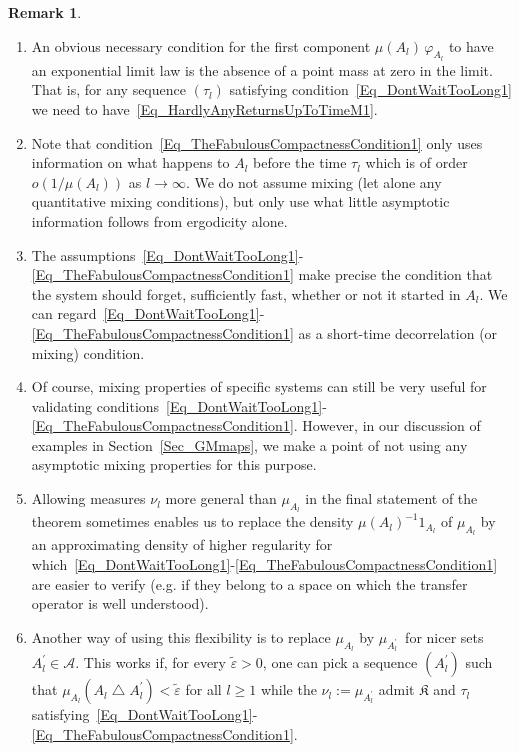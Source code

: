 \documentclass[10pt]{amsart}
\theoremstyle{definition}\newtheorem{defi}[theo]{Definition}\newtheorem{rema}[theo]{Remark}\newtheorem{exam}[theo]{Example}\newtheorem{exem}[theo]{Example}\newtheorem{nota}[theo]{Notation}
\newcommand{\clA}{\mathcal{A}}
\newcommand{\frkK}{\mathfrak{K}}
\newcommand*{\alphenumi}{\renewcommand*{\theenumi}{\alph{enumi}}}
\begin{document}
\begin{rema}\leavevmode
\begin{enumerate}\alphenumi
\item\label{rema3.7.a} An obvious necessary condition for the first component $\mu (A_{l})\,\varphi_{A_{l}}$ to have an exponential limit law is the absence of a point mass at zero in the limit. That is, for any sequence $(\tau_{l})$ satisfying condition~\eqref{Eq_DontWaitTooLong1} we need to have~\eqref{Eq_HardlyAnyReturnsUpToTimeM1}.
\item\label{rema3.7.b} Note that condition~\eqref{Eq_TheFabulousCompactnessCondition1} only uses information on what happens to $A_{l}$ before the time $\tau_{l}$ which is of order $o(1/\mu (A_{l}))$ as $l\rightarrow\infty$. We do not assume mixing (let alone any quantitative mixing conditions), but only use what little asymptotic information follows from ergodicity alone.
\item\label{rema3.7.c} The assumptions~\eqref{Eq_DontWaitTooLong1}-\eqref{Eq_TheFabulousCompactnessCondition1} make precise the condition that the system should forget, sufficiently fast, whether or not it started in $A_{l}$. We can regard~\eqref{Eq_DontWaitTooLong1}-\eqref{Eq_TheFabulousCompactnessCondition1} as a short-time decorrelation (or mixing) condition.
\item\label{rema3.7.d} Of course, mixing properties of specific systems can still be very useful for validating conditions~\eqref{Eq_DontWaitTooLong1}-\eqref{Eq_TheFabulousCompactnessCondition1}. However, in our discussion of examples in Section~\ref{Sec_GMmaps}, we make a point of not using any asymptotic mixing properties for this purpose.
\item\label{rema3.7.e} Allowing measures $\nu_{l}$ more general than $\mu_{A_{l} }$ in the final statement of the theorem sometimes enables us to replace the density $\mu(A_{l})^{-1}1_{A_{l}}$ of $\mu_{A_{l}}$ by an approximating density of higher regularity for which~\eqref{Eq_DontWaitTooLong1}-\eqref{Eq_TheFabulousCompactnessCondition1} are easier to verify (e.g. if they belong to a space on which the transfer operator is well understood).
\item\label{rema3.7.f} Another way of using this flexibility is to replace $\mu_{A_{l}}$ by $\mu_{A_{l}^{\prime}}$\ for nicer sets $A_{l} ^{\prime}\in\clA$. This works if, for every $\widetilde{\varepsilon} >0$, one can pick a sequence $(A_{l}^{\prime})$ such that $\mu_{A_{l}} (A_{l}\bigtriangleup A_{l}^{\prime})<\widetilde{\varepsilon}$ for all $l\geq1$ while the $\nu_{l}:=\mu_{A_{l}^{\prime}}$ admit $\frkK$ and $\tau_{l}$ satisfying~\eqref{Eq_DontWaitTooLong1}-\eqref{Eq_TheFabulousCompactnessCondition1}.
\end{enumerate}
\end{rema}
\end{document}
